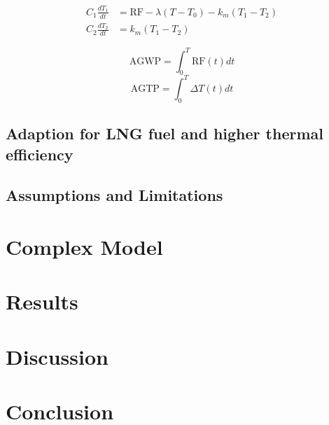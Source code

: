 \documentclass{article}
\begin{document}
\begin{align}
    C_1 \frac{dT_1}{dt} &= \text{RF} - \lambda(T - T_0) - k_m(T_1 - T_2) \\
    C_2 \frac{dT_2}{dt} &= k_m(T_1 - T_2)
\end{align}

\begin{equation}
    \text{AGWP} = \int_0^T \text{RF}(t) dt
\end{equation}
\begin{equation}
    \text{AGTP} = \int_0^T \Delta T(t) dt
\end{equation}

\subsection{Adaption for LNG fuel and higher thermal efficiency}

\subsection{Assumptions and Limitations}



\section{Complex Model}




\section{Results}

\section{Discussion}

\section{Conclusion}
\end{document}
